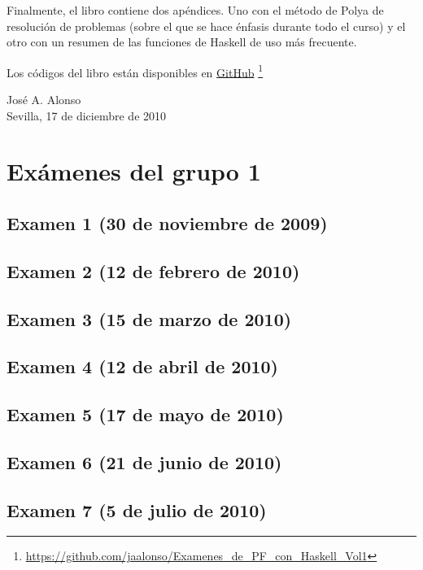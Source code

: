 \documentclass[a4paper,12pt,twoside]{book}
\begin{document}
Finalmente, el libro contiene dos apéndices. Uno con el método de Polya
de resolución de problemas (sobre el que se hace énfasis durante todo el
curso) y el otro con un resumen de las funciones de Haskell de uso más
frecuente.

Los códigos del libro están disponibles en
\href{https://github.com/jaalonso/Examenes_de_PF_con_Haskell_Vol1}
     {GitHub}
     \footnote{{\url{https://github.com/jaalonso/Examenes_de_PF_con_Haskell_Vol1}}}

\begin{flushright}
  José A. Alonso \\
  Sevilla, 17 de diciembre de 2010
\end{flushright}

\chapter{Exámenes del grupo 1}

\section{Examen 1 (30 de noviembre de 2009)}
\section{Examen 2 (12 de febrero de 2010)}
\section{Examen 3 (15 de marzo de 2010)}
\section{Examen 4 (12 de abril de 2010)} 
\section{Examen 5 (17 de mayo de 2010)}
\section{Examen 6 (21 de junio de 2010)}
\section{Examen 7 (5 de julio de 2010)}
\label{examen_09_10_1_7}
\end{document}
